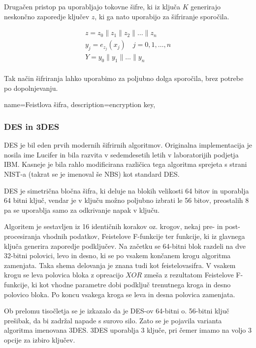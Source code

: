 \documentclass[12pt,a4paper,openany]{book}
\begin{document}
Drugačen pristop pa uporabljajo tokovne šifre, ki iz ključa $K$ generirajo neskončno zaporedje ključev $z$, ki ga nato uporabijo za šifriranje sporočila.

\begin{gather*}
z=z_0\|z_1\|z_2\|\ldots\|z_n \\
y_j=e_{z_j}(x_j) \quad j=0,1,\ldots,n\\
Y = y_0\|y_1\|\ldots\|y_n \\
\end{gather*}

Tak način šifriranja lahko uporabimo za poljubno dolga sporočila, brez potrebe po dopolnjevanju.



{
  name=Feistlova šifra,
  description={encryption key},
}


\subsubsection{DES in 3DES}

\gls{DES} je bil eden prvih modernih šifrirnih algoritmov. Originalna implementacija je nosila ime Lucifer in bila razvita v sedemdesetih letih v laboratorijih podjetja IBM. Kasneje je bila rahlo modificirana različica tega algoritma sprejeta s strani \acrshort{NIST}-a (takrat se je imenoval še \acrshort{NBS}) kot standard \gls{DES}.

\gls{DES} je simetrična bločna šifra, ki deluje na blokih velikosti 64 bitov in uporablja 64 bitni ključ, vendar je v ključu možno poljubno izbrati le 56 bitov, preostalih 8 pa se uporablja samo za odkrivanje napak v ključu.

Algoritem je sestavljen iz 16 identičnih korakov oz. krogov, nekaj pre- in post-procesiranja vhodnih podatkov, Feistelove F-funkcije ter funkcije, ki iz glavnega ključa generira zaporedje podključev. Na začetku se 64-bitni blok razdeli na dve 32-bitni polovici, levo in desno, ki se po vsakem končanem krogu algoritma zamenjata. Taka shema delovanja je znana tudi kot \gls{feistelovasifra}. V vsakem krogu se leva polovica bloka z opreacijo $XOR$ zmeša z rezultatom Feistelove F-funkcije, ki kot vhodne parametre dobi podključ trenutnega kroga in desno polovico bloka. Po koncu vsakega kroga se leva in desna polovica zamenjata.

Ob prelomu tisočletja se je izkazalo da je \gls{DES}-ov 64-bitni o. 56-bitni ključ prešibak, da bi zadržal napade s surovo silo. Zato se je pojavila varianta algoritma imenovana 3DES. 3DES uporablja 3 ključe, pri čemer imamo na voljo 3 opcije za izbiro ključev.
\end{document}
